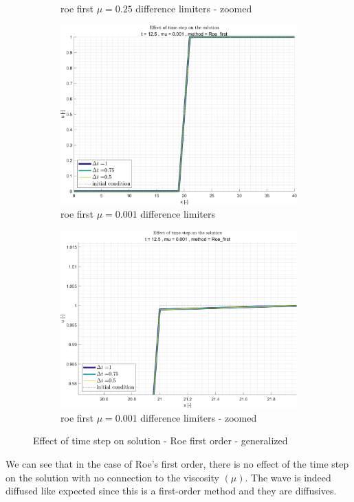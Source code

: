 \documentclass[11pt, a4paper]{article}
\begin{document}
\begin{figure}[H]
\begin{subfigure}[c]{.49\textwidth}
        \caption{roe first $\mu=0.25$ difference limiters - zoomed}
        \label{fig:roe_first_general_mu0.25_B}
    \end{subfigure}
    \begin{subfigure}[c]{.49\textwidth}
        \centering
        \includegraphics[width=\textwidth]{images/grap9.png}
        \caption{roe first $\mu=0.001$ difference limiters}
        \label{fig:roe_first_general_mu0.001_A}
    \end{subfigure}
    \hfill
    \begin{subfigure}[c]{.49\textwidth}
        \centering
        \includegraphics[width=\textwidth]{images/grap9.1.png}
        \caption{roe first $\mu=0.001$ difference limiters - zoomed}
        \label{fig:roe_first_general_mu0.001_B}
    \end{subfigure}
    \caption{Effect of time step on solution - Roe first order - generalized}
        \label{fig:roe_first_general}
\end{figure}
We can see that in the case of Roe's first order, there is no effect of the time step on the solution with no connection to the viscosity $\left(\mu\right)$. The wave is indeed diffused like expected since this is a first-order method and they are diffusives. 
\end{document}
